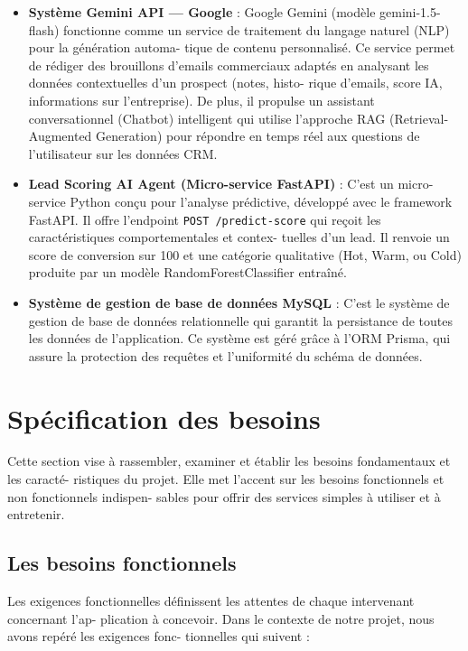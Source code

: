 \begin{itemize}
    \item \textbf{Système Gemini API — Google} : Google Gemini (modèle gemini-1.5-flash) fonctionne comme un service de traitement du langage naturel (NLP) pour la génération automa-
    tique de contenu personnalisé. Ce service permet de rédiger des brouillons d’emails commerciaux adaptés en analysant les données contextuelles d’un prospect (notes, histo-
    rique d’emails, score IA, informations sur l’entreprise). De plus, il propulse un assistant conversationnel (Chatbot) intelligent qui utilise l’approche RAG (Retrieval-Augmented Generation) pour répondre en temps réel aux questions de l’utilisateur sur les données CRM.
    
    \item \textbf{Lead Scoring AI Agent (Micro-service FastAPI)} : C’est un micro-service Python conçu pour l’analyse prédictive, développé avec le framework FastAPI. Il offre l’endpoint \texttt{POST /predict-score} qui reçoit les caractéristiques comportementales et contex-
    tuelles d’un lead. Il renvoie un score de conversion sur 100 et une catégorie qualitative (Hot, Warm, ou Cold) produite par un modèle RandomForestClassifier entraîné.
    
    \item \textbf{Système de gestion de base de données MySQL} : C’est le système de gestion de base de données relationnelle qui garantit la persistance de toutes les données de l’application. Ce système est géré grâce à l’ORM Prisma, qui assure la protection des requêtes et l’uniformité du schéma de données.
\end{itemize}

\section{Spécification des besoins}

Cette section vise à rassembler, examiner et établir les besoins fondamentaux et les caracté-
ristiques du projet. Elle met l’accent sur les besoins fonctionnels et non fonctionnels indispen-
sables pour offrir des services simples à utiliser et à entretenir.

\subsection{Les besoins fonctionnels}

Les exigences fonctionnelles définissent les attentes de chaque intervenant concernant l’ap-
plication à concevoir. Dans le contexte de notre projet, nous avons repéré les exigences fonc-
tionnelles qui suivent :

